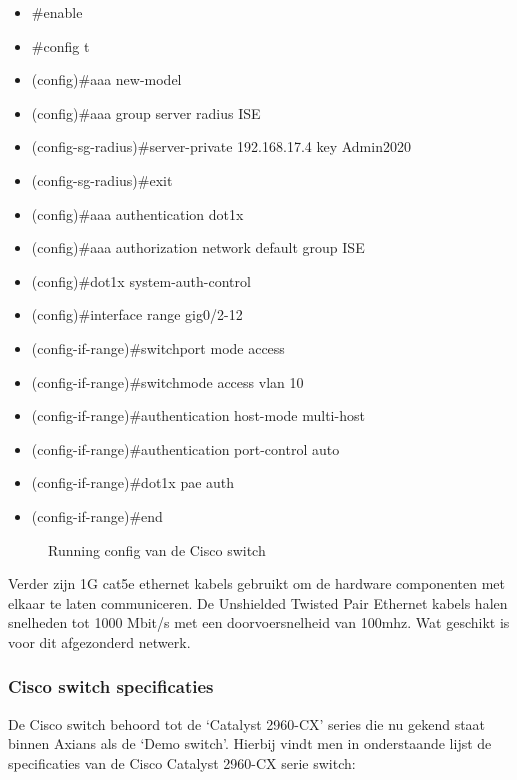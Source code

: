 \begin{itemize}
	\item \#enable
	\item \#config t
	\item (config)\#aaa new-model
	\item (config)\#aaa group server radius ISE
	\item (config-sg-radius)\#server-private 192.168.17.4 key Admin2020
	\item (config-sg-radius)\#exit
	\item (config)\#aaa authentication dot1x
	\item (config)\#aaa authorization network default group ISE
	\item (config)\#dot1x system-auth-control
	\item (config)\#interface range gig0/2-12
	\item (config-if-range)\#switchport mode access
	\item (config-if-range)\#switchmode access vlan 10
	\item (config-if-range)\#authentication host-mode multi-host
	\item (config-if-range)\#authentication port-control auto
	\item (config-if-range)\#dot1x pae auth
	\item (config-if-range)\#end
\end{itemize}

\begin{figure}[H]
	\centering
	\qquad
	\qquad
	\caption{Running config van de Cisco switch}%
	\label{fig:RunningConfig}%
\end{figure}
Verder zijn 1G cat5e ethernet kabels gebruikt om de hardware componenten met elkaar te laten communiceren. De Unshielded Twisted Pair Ethernet kabels halen snelheden tot 1000 Mbit/s met een doorvoersnelheid van 100mhz. Wat geschikt is voor dit afgezonderd netwerk.

\subsubsection{Cisco switch specificaties}
De Cisco switch behoord tot de ‘Catalyst 2960-CX’ series die nu gekend staat binnen Axians als de ‘Demo switch’. Hierbij vindt men in onderstaande lijst de specificaties van de Cisco Catalyst 2960-CX serie switch:

